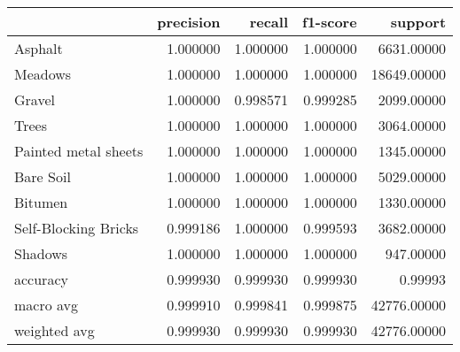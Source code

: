 \begin{tabular}{lrrrr}
\toprule
{} &  precision &    recall &  f1-score &      support \\
\midrule
Asphalt              &   1.000000 &  1.000000 &  1.000000 &   6631.00000 \\
Meadows              &   1.000000 &  1.000000 &  1.000000 &  18649.00000 \\
Gravel               &   1.000000 &  0.998571 &  0.999285 &   2099.00000 \\
Trees                &   1.000000 &  1.000000 &  1.000000 &   3064.00000 \\
Painted metal sheets &   1.000000 &  1.000000 &  1.000000 &   1345.00000 \\
Bare Soil            &   1.000000 &  1.000000 &  1.000000 &   5029.00000 \\
Bitumen              &   1.000000 &  1.000000 &  1.000000 &   1330.00000 \\
Self-Blocking Bricks &   0.999186 &  1.000000 &  0.999593 &   3682.00000 \\
Shadows              &   1.000000 &  1.000000 &  1.000000 &    947.00000 \\
accuracy             &   0.999930 &  0.999930 &  0.999930 &      0.99993 \\
macro avg            &   0.999910 &  0.999841 &  0.999875 &  42776.00000 \\
weighted avg         &   0.999930 &  0.999930 &  0.999930 &  42776.00000 \\
\bottomrule
\end{tabular}
